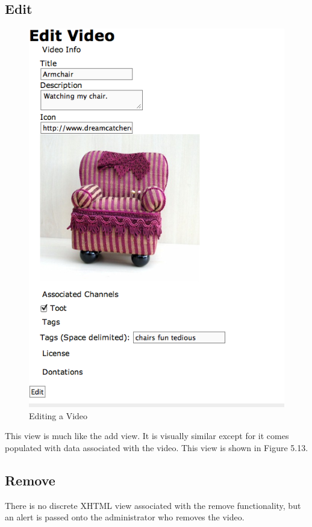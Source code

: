 \documentclass[a4paper,12pt]{report}
\begin{document}
\subsection{Edit}
\begin{figure}[htp]
\begin{center}
\includegraphics[width=150mm]{./images/videoedit.png}
\end{center}
\caption{Editing a Video}
\end{figure}

This view is much like the add view. It is visually similar except for it comes populated with data associated with the video. This view is shown in Figure 5.13.

\subsection{Remove}
There is no discrete XHTML view associated with the remove functionality, but an alert is passed onto the administrator who removes the video.
\end{document}
